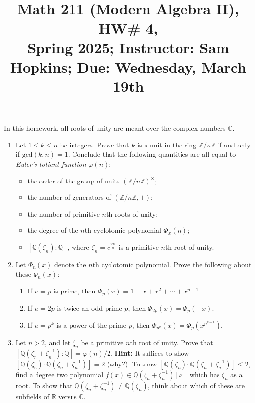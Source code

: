 \documentclass[11pt]{article}
\title{Math 211 (Modern Algebra II), HW\# 4, \\ {\normalsize Spring 2025; Instructor: Sam Hopkins; Due: Wednesday, March 19th}}
\date{}
\begin{document}
\maketitle

\thispagestyle{empty}

In this homework, all roots of unity are meant over the complex numbers $\mathbb{C}$.

\begin{enumerate}

\item Let $1 \leq k \leq n$ be integers. Prove that $k$ is a unit in the ring $\mathbb{Z}/n\mathbb{Z}$ if and only if $\mathrm{gcd}(k,n)=1$. Conclude that the following quantities are all equal to \emph{Euler's totient function} $\varphi(n)$:
\begin{itemize}
\item the order of the group of units $(\mathbb{Z}/n\mathbb{Z})^{\times}$;
\item the number of generators of $(\mathbb{Z}/n\mathbb{Z},+)$;
\item the number of primitive $n$th roots of unity;
\item the degree of the $n$th cyclotomic polynomial $\Phi_x(n)$;
\item $[\mathbb{Q}(\zeta_n)\colon\mathbb{Q}]$, where $\zeta_n=e^{\frac{2\pi i}{n}}$ is a primitive $n$th root of unity.
\end{itemize}

\item Let $\Phi_n(x)$ denote the $n$th cyclotomic polynomial. Prove the following about these $\Phi_n(x)$:
\begin{enumerate}
\item If $n=p$ is prime, then $\Phi_p(x) = 1+x+x^2+\cdots+x^{p-1}$.
\item If $n=2p$ is twice an odd prime $p$, then $\Phi_{2p}(x) = \Phi_p(-x)$.
\item If $n=p^k$ is a power of the prime $p$, then $\Phi_{p^k}(x) = \Phi_{p}(x^{p^{k-1}})$.
\end{enumerate}

\item Let $n > 2$, and let $\zeta_n$ be a primitive $n$th root of unity. Prove that $[\mathbb{Q}(\zeta_n+\zeta_n^{-1}):\mathbb{Q}] = \varphi(n)/2$. {\bf Hint:} It suffices to show $[\mathbb{Q}(\zeta_n):\mathbb{Q}(\zeta_n+\zeta_n^{-1})]=2$ (why?). To show $[\mathbb{Q}(\zeta_n):\mathbb{Q}(\zeta_n+\zeta_n^{-1})] \leq 2$, find a degree two polynomial $f(x) \in \mathbb{Q}(\zeta_n+\zeta_n^{-1})[x]$ which has $\zeta_n$ as a root. To show that $\mathbb{Q}(\zeta_n+\zeta_n^{-1}) \neq \mathbb{Q}(\zeta_n)$, think about which of these are subfields of $\mathbb{R}$ versus $\mathbb{C}$.


\end{enumerate}
\end{document}
